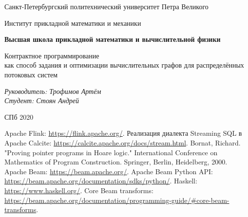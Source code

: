 \documentclass[a4paper,12pt]{article}
\begin{document}
\thispagestyle{empty}
\begin{center}



    Санкт-Петербургский политехнический университет Петра Великого

    Институт прикладной математики и механики

    \textbf{Высшая школа прикладной математики и вычислительной
    физики}
\end{center}
\vspace{13ex}

\begin{center}
    \vspace{16ex}
    \begin{spacing}{1.5}
        {\Large Контрактное программирование \\как способ задания и оптимизации вычислительных графов для распределённых потоковых систем}
    \end{spacing}
\end{center}
\vfill
\begin{flushright}
    \noindent
    \textit{Руководитель: Трофимов Артём} \\
    \textit{Студент: Стоян Андрей}
\end{flushright}
\vspace{5ex}
\begin{center}
    СПб 2020
\end{center}
\newpage

\tableofcontents
\newpage


\newpage

\newpage

\newpage

\newpage




\newpage

\begin{thebibliography}{9}
     Apache Flink: \url{https://flink.apache.org/}.
     Реализация диалекта Streaming SQL в Apache Calcite: \url{https://calcite.apache.org/docs/stream.html}.
     Bornat, Richard. "Proving pointer programs in Hoare logic." International Conference on Mathematics of Program Construction. Springer, Berlin, Heidelberg, 2000.
     Apache Beam: \url{https://beam.apache.org/}.
     Apache Beam Python API: \url{https://beam.apache.org/documentation/sdks/python/}.
     Haskell: \url{https://www.haskell.org/}.
     Core Beam transforms: \url{https://beam.apache.org/documentation/programming-guide/#core-beam-transforms}.
\end{thebibliography}
\end{document}
